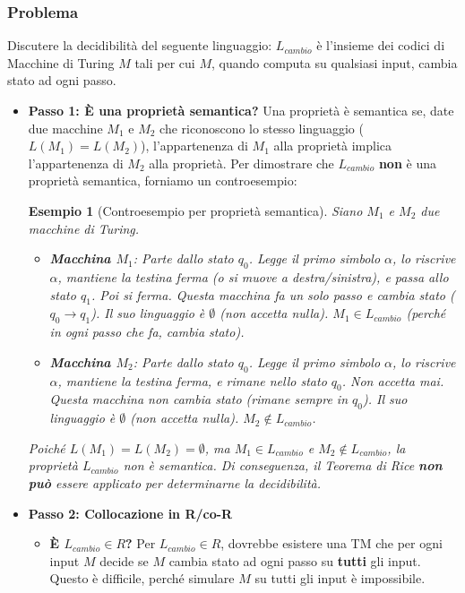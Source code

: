 \documentclass[a4paper]{article}
\newtheorem{example}{Esempio}
\begin{document}
\subsubsection{Problema}
Discutere la decidibilità del seguente linguaggio: $L_{cambio}$ è l'insieme dei codici di Macchine di Turing $M$ tali per cui $M$, quando computa su qualsiasi input, cambia stato ad ogni passo.
\begin{itemize}
    \item \textbf{Passo 1: È una proprietà semantica?}
    Una proprietà è semantica se, date due macchine $M_1$ e $M_2$ che riconoscono lo stesso linguaggio ($L(M_1) = L(M_2)$), l'appartenenza di $M_1$ alla proprietà implica l'appartenenza di $M_2$ alla proprietà.
    Per dimostrare che $L_{cambio}$ \textbf{non} è una proprietà semantica, forniamo un controesempio:
    \begin{example}[Controesempio per proprietà semantica]
        Siano $M_1$ e $M_2$ due macchine di Turing.
        \begin{itemize}
            \item \textbf{Macchina $M_1$}:
            Parte dallo stato $q_0$. Legge il primo simbolo $\alpha$, lo riscrive $\alpha$, mantiene la testina ferma (o si muove a destra/sinistra), e passa allo stato $q_1$. Poi si ferma.
            Questa macchina fa un solo passo e cambia stato ($q_0 \to q_1$). Il suo linguaggio è $\emptyset$ (non accetta nulla). $M_1 \in L_{cambio}$ (perché in ogni passo che fa, cambia stato).
            \item \textbf{Macchina $M_2$}:
            Parte dallo stato $q_0$. Legge il primo simbolo $\alpha$, lo riscrive $\alpha$, mantiene la testina ferma, e rimane nello stato $q_0$. Non accetta mai.
            Questa macchina non cambia stato (rimane sempre in $q_0$). Il suo linguaggio è $\emptyset$ (non accetta nulla). $M_2 \notin L_{cambio}$.
        \end{itemize}
        Poiché $L(M_1) = L(M_2) = \emptyset$, ma $M_1 \in L_{cambio}$ e $M_2 \notin L_{cambio}$, la proprietà $L_{cambio}$ non è semantica. Di conseguenza, il Teorema di Rice \textbf{non può} essere applicato per determinarne la decidibilità.
    \end{example}

    \item \textbf{Passo 2: Collocazione in R/co-R}
    \begin{itemize}
        \item \textbf{È $L_{cambio} \in R$?}
        Per $L_{cambio} \in R$, dovrebbe esistere una TM che per ogni input $M$ decide se $M$ cambia stato ad ogni passo su \textbf{tutti} gli input. Questo è difficile, perché simulare $M$ su tutti gli input è impossibile.


\end{itemize}
\end{itemize}
\end{document}
